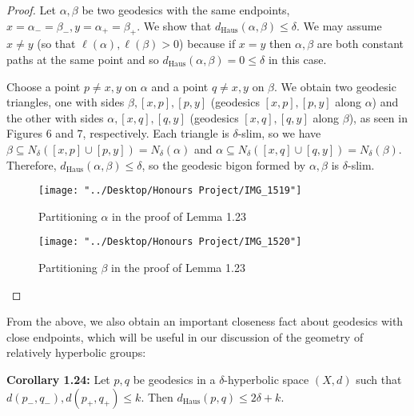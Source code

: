 \documentclass[12pt]{article}
\newcommand{\vs}{\vskip10pt}
\begin{document}
	\begin{proof}
		
		Let $\alpha, \beta$ be two geodesics with the same endpoints, $x = \alpha_- = \beta_-, y = \alpha_+ = \beta_+$. We show that $d_{\text{Haus}}(\alpha, \beta) \leq \delta$. We may assume $x \neq y$ (so that $\ell(\alpha), \ell(\beta) > 0$) because if $x = y$ then $\alpha, \beta$ are both constant paths at the same point and so $d_{\text{Haus}}(\alpha, \beta) = 0 \leq \delta$ in this case. 
		
		\vs 
		
		Choose a point $p \neq x,y$ on $\alpha$ and a point $q \neq x,y$ on $\beta$. We  obtain two geodesic triangles, one with sides $\beta, [x,p], [p,y]$ (geodesics $[x,p], [p,y]$ along $\alpha$) and the other with sides $\alpha, [x, q], [q, y]$ (geodesics $ [x, q], [q, y]$ along $\beta$), as seen in Figures 6 and 7, respectively. Each triangle is $\delta$-slim, so we have $\beta \subseteq N_{\delta}([x,p] \cup [p, y]) = N_{\delta}(\alpha)$ and $\alpha \subseteq N_{\delta}([x,q] \cup [q, y]) = N_{\delta}(\beta)$. Therefore, $d_{\text{Haus}}(\alpha, \beta) \leq \delta$, so the geodesic bigon formed by $\alpha, \beta$ is $\delta$-slim. 
		
\begin{figure} [H]
	\centering
	\texttt{[image: "../Desktop/Honours Project/IMG\_1519"]}
	\caption{Partitioning $\alpha$ in the proof of Lemma 1.23}
	\label{fig:img1519}
\end{figure}

\begin{figure} [H]
	\centering
	\texttt{[image: "../Desktop/Honours Project/IMG\_1520"]}
	\caption{Partitioning $\beta$ in the proof of Lemma 1.23}
	\label{fig:img1520}
\end{figure}

		
	\end{proof}
	
	
	From the above, we also obtain an important closeness fact about geodesics with close endpoints, which will be useful in our discussion of the geometry of relatively hyperbolic groups: 
	
	\vs 
	
	\textbf{Corollary 1.24: } Let $p,q$ be geodesics in a $\delta$-hyperbolic space $(X,d)$ such that $d(p_-, q_-), d(p_+, q_+) \leq k$. Then $d_{\text{Haus}}(p,q) \leq 2 \delta + k$. 
	
\end{document}

